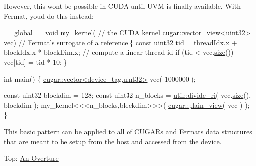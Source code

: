 \begin{DoxyParagraph}{}
However, this won\textquotesingle{}t be possible in C\+U\+DA until U\+VM is finally available. With Fermat, you\textquotesingle{}d do this instead\+: 
\begin{DoxyCode}
\_\_global\_\_ \textcolor{keywordtype}{void} my\_kernel(                   \textcolor{comment}{// the CUDA kernel}
    \hyperlink{structcugar_1_1vector__view}{cugar::vector\_view<uint32>} vec)          \textcolor{comment}{// Fermat's surrogate of a reference}
\{
    \textcolor{keyword}{const} uint32 tid = threadIdx.x + blockIdx.x * blockDim.x; \textcolor{comment}{// compute a linear thread id}
    \textcolor{keywordflow}{if} (tid < vec.\hyperlink{structcugar_1_1vector__view_a773841d0e535b07e40a99891e22d937e}{size}())
        vec[tid] = tid * 10;
\}

\textcolor{keywordtype}{int} main()
\{
    \hyperlink{structcugar_1_1vector}{cugar::vector<device\_tag,uint32>} vec( 1000000 );

    \textcolor{keyword}{const} uint32 blockdim = 128;
    \textcolor{keyword}{const} uint32 n\_blocks = \hyperlink{group___basic_utils_gabb6714186dbbd864f0a9298944ba509b}{util::divide\_ri}( vec.\hyperlink{structcugar_1_1vector__view_a773841d0e535b07e40a99891e22d937e}{size}(), blockdim );
    my\_kernel<<<n\_blocks,blockdim>>>( \hyperlink{namespacecugar_a347f91de482f0cb8dcba21c086b0aa46}{cugar::plain\_view}( vec ) );
\}
\end{DoxyCode}
 
\end{DoxyParagraph}
\begin{DoxyParagraph}{}
This basic pattern can be applied to all of \hyperlink{cugar_page}{C\+U\+G\+AR}\textquotesingle{}s and \hyperlink{index}{Fermat}\textquotesingle{}s data structures that are meant to be setup from the host and accessed from the device.
\end{DoxyParagraph}
Top\+: \hyperlink{_overture_page}{An Overture} 